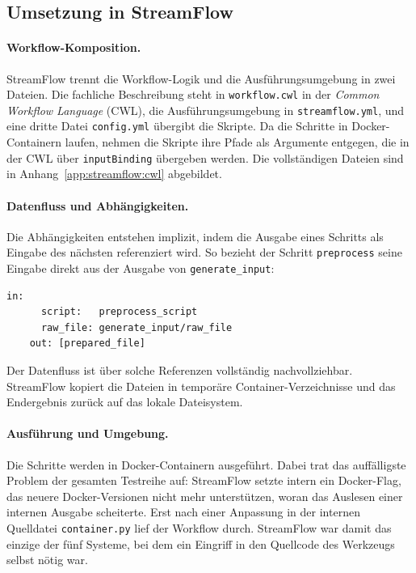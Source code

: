 \subsection{Umsetzung in StreamFlow}
\label{sec:practical:pipeline:streamflow}

\paragraph{Workflow-Komposition.}
StreamFlow trennt die Workflow-Logik und die Ausführungsumgebung in zwei Dateien. Die fachliche
Beschreibung steht in \texttt{workflow.cwl} in der \emph{Common Workflow Language} (CWL), die
Ausführungsumgebung in \texttt{streamflow.yml}, und eine dritte Datei \texttt{config.yml} übergibt
die Skripte. Da die Schritte in Docker-Containern laufen, nehmen die Skripte ihre Pfade als
Argumente entgegen, die in der CWL über \texttt{inputBinding} übergeben werden. Die vollständigen
Dateien sind in Anhang~\ref{app:streamflow:cwl} abgebildet.

\paragraph{Datenfluss und Abhängigkeiten.}
Die Abhängigkeiten entstehen implizit, indem die Ausgabe eines Schritts als Eingabe des nächsten
referenziert wird. So bezieht der Schritt \texttt{preprocess} seine Eingabe direkt aus der Ausgabe
von \texttt{generate\_input}:

\begin{lstlisting}[caption={Implizite Abhängigkeit über eine CWL-Referenz (StreamFlow, Pipeline)},label={lst:pipe:sf:ref}]
    in:
      script:   preprocess_script
      raw_file: generate_input/raw_file
    out: [prepared_file]
\end{lstlisting}

Der Datenfluss ist über solche Referenzen vollständig nachvollziehbar. StreamFlow kopiert die
Dateien in temporäre Container-Verzeichnisse und das Endergebnis zurück auf das lokale Dateisystem.

\paragraph{Ausführung und Umgebung.}
Die Schritte werden in Docker-Containern ausgeführt. Dabei trat das auffälligste Problem der
gesamten Testreihe auf: StreamFlow setzte intern ein Docker-Flag, das neuere Docker-Versionen nicht
mehr unterstützen, woran das Auslesen einer internen Ausgabe scheiterte. Erst nach einer Anpassung
in der internen Quelldatei \texttt{container.py} lief der Workflow durch. StreamFlow war damit das
einzige der fünf Systeme, bei dem ein Eingriff in den Quellcode des Werkzeugs selbst nötig war.

